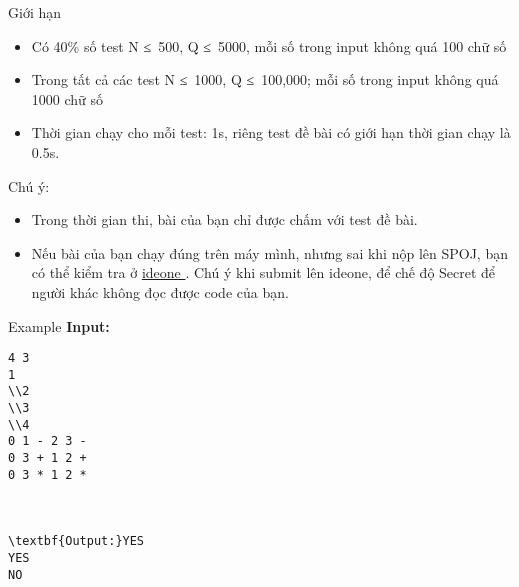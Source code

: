 Giới hạn  
\begin{itemize}
	\item     Có 40\% số test N ≤ 500, Q ≤ 5000, mỗi số trong input không quá 100 chữ số   
	\item     Trong tất cả các test N ≤ 1000, Q ≤ 100,000; mỗi số trong input không quá 1000 chữ số   
	\item     Thời gian chạy cho mỗi test: 1s, riêng test đề bài có giới hạn thời gian chạy là 0.5s.   
\end{itemize}
   Chú ý:  
\begin{itemize}
	\item     Trong thời gian thi, bài của bạn chỉ được chấm với test đề bài.   
	\item     Nếu bài của bạn chạy đúng trên máy mình, nhưng sai khi nộp lên SPOJ, bạn có thể kiểm tra ở    \href{https://ideone.com}{     ideone    }    . Chú ý khi submit lên ideone, để chế độ Secret để người khác không đọc được code của bạn.   
\end{itemize}
   Example  
\textbf{    Input:   }
\begin{verbatim}
4 3
1
\\2
\\3
\\4
0 1 - 2 3 -
0 3 + 1 2 +
0 3 * 1 2 *



\textbf{Output:}YES
YES
NO\end{verbatim}